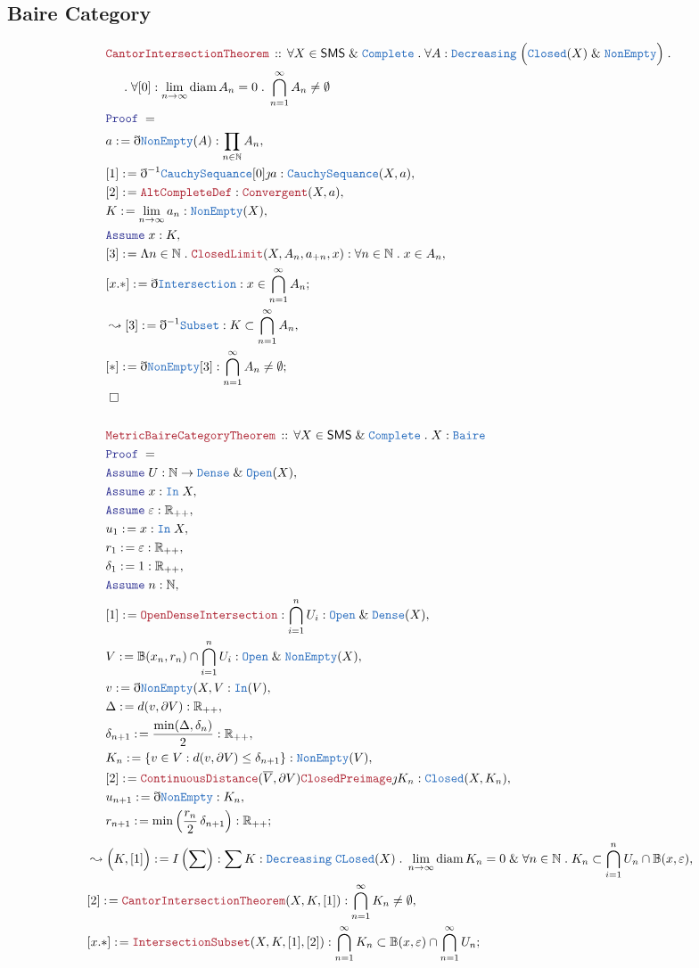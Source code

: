 \documentclass[12pt]{scrartcl}
\newcommand{\TYPE}[1]{\textcolor{NavyBlue}{\mathtt{#1}}}
\newcommand{\LOGIC}[1]{\textcolor{Blue}{\mathtt{#1}}}
\newcommand{\THM}[1]{\textcolor{Maroon}{\mathtt{#1}}}
\renewcommand{\.}{\; . \;}
\newcommand{\de}{: \kern 0.1pc =}
\newcommand{\Act}[1]{\left( #1 \right)}
\newcommand{\Theorem}[2]{& \THM{#1} \, :: \, #2 \\ & \Proof = \\ }
\newcommand{\NewLine}{\\ & \kern 1pc}
\newcommand{\Page}[1]{ \begin{align*} #1 \end{align*}   }
\newcommand{ \bd }{ \ByDef }
\renewcommand{\And}{\; \& \;}
\newcommand{\Reals}{\mathbb{R} }
\newcommand{\Nat}{\mathbb{N} }
\newcommand{\Say}[3]{& #1 \de #2 : #3, \\}
\newcommand{\Conclude}[3]{& #1 \de #2 : #3; \\}
\newcommand{\Derive}[3]{& \leadsto #1 \de #2 : #3, \\}
\newcommand{\Assume}[2]{& \LOGIC{Assume} \; #1 : #2, \\}
\newcommand{\QED}{\; \square}
\newcommand{\EndProof}{& \QED \\}
\newcommand{\ByDef}{\eth}
\newcommand{\ByConstr}{\jmath}
\newcommand{\Proof}{\LOGIC{Proof} \; }
\DeclareMathOperator{\diam}{diam}
\newcommand{\SMS}{\mathsf{SMS}}
\begin{document}
\subsection{Baire Category}
\Page{
	\Theorem{CantorIntersectionTheorem}
	{
		\forall X \in \SMS \And \TYPE{Complete} \.
		\forall A : \TYPE{Decreasing} \; \Big(\TYPE{Closed}(X) \And \TYPE{NonEmpty}\Big) \. \NewLine \.
		\forall [0] : \lim_{n \to \infty} \diam A_n = 0 \. 
		\bigcap^\infty_{n=1} A_n \neq\emptyset
	}
	\Say{a}{\bd \TYPE{NonEmpty}(A)}{\prod_{n \in \Nat} A_n}
	\Say{[1]}{\bd^{-1} \TYPE{CauchySequance}[0]\ByConstr a}{ \TYPE{CauchySequance}(X,a)}
	\Say{[2]}{\THM{AltCompleteDef}}{\THM{Convergent}(X,a)}
	\Say{K}{\lim_{n \to \infty} a_n}{\TYPE{NonEmpty}(X)}
	\Assume{x}{K}
	\Say{[3]}{\Lambda n \in \Nat \. \THM{ClosedLimit}(X,A_n,a_{+n},x)}{\forall n \in \Nat \. x \in A_n}
	\Conclude{[x.*]}{\bd\TYPE{Intersection}}{x \in \bigcap^\infty_{n=1} A_n}
	\Derive{[3]}{\bd^{-1}\TYPE{Subset}}{K \subset \bigcap^\infty_{n=1} A_n}
	\Conclude{[*]}{\bd \TYPE{NonEmpty}[3]}{  \bigcap^\infty_{n=1} A_n \neq \emptyset }
	\EndProof
	\\
	\Theorem{MetricBaireCategoryTheorem}
	{
		\forall X \in \SMS \And \TYPE{Complete} \. X : \TYPE{Baire}
	}
	\Assume{U}{\Nat \to \TYPE{Dense} \And \TYPE{Open}(X)}
	\Assume{x}{\TYPE{In} \; X}
	\Assume{\varepsilon}{\Reals_{++}}
	\Say{u_1}{x}{\TYPE{In}\;X}
	\Say{r_1}{\varepsilon}{\Reals_{++}}
	\Say{\delta_1}{1}{\Reals_{++}}
	\Assume{n}{\Nat}
	\Say{[1]}{\THM{OpenDenseIntersection}}{\bigcap^n_{i=1} U_i : \TYPE{Open} \And \TYPE{Dense}(X)}
	\Say{V}{\mathbb{B}(x_n,r_n)\cap\bigcap^n_{i=1} U_i}{\TYPE{Open} \And \TYPE{NonEmpty}(X)}
	\Say{v}{\bd \TYPE{NonEmpty}(X,V}{\TYPE{In}(V)}
	\Say{\Delta}{d(v,\partial V)}{\Reals_{++}}
	\Say{\delta_{n+1}}{\frac{\min(\Delta,\delta_n)}{2}}{\Reals_{++}}
	\Say{K_n}{\{  v \in V :  d(v,\partial V) \le \delta_{n+1}   \}}{\TYPE{NonEmpty}(V)}
	\Say{[2]}{\THM{ContinuousDistance}(\overline{V},\partial V)\THM{ClosedPreimage}\ByConstr K_n}{\TYPE{Closed}(X,K_n)}
	\Say{u_{n+1}}{\bd \TYPE{NonEmpty}}{K_n}
	\Conclude{r_{n+1}}{\min\left(\frac{r_n}{2}\, \delta_{n+1} \right)}{\Reals_{++}}
}\Page{
	\Derive{\Big( K,[1]\Big)}{I\Act{\sum}}{  \sum  K : \TYPE{Decreasing}\;\TYPE{CLosed}(X) \.   \lim_{n \to \infty}\diam  K_n = 0 \And \forall n \in \Nat  \. K_n \subset \bigcap^n_{i=1} U_n \cap \mathbb{B}(x,\varepsilon)  }
	\Say{[2]}{\THM{CantorIntersectionTheorem}(X,K,[1])}{\bigcap^\infty_{n=1} K_n \neq \emptyset}
	\Conclude{[x.*]}{\THM{IntersectionSubset}(X,K,[1],[2])}{\bigcap^\infty_{n=1} K_n \subset \mathbb{B}(x,\varepsilon) \cap \bigcap^\infty_{n=1} U_n}
}
\end{document}
